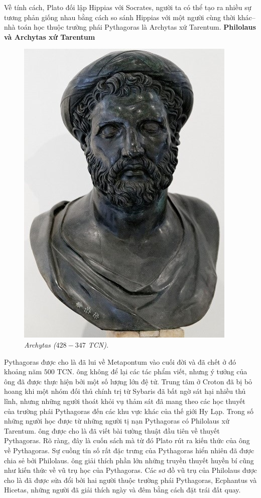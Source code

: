 \begin{multicols}{2}
	\vskip 0.05cm
	Về tính cách, Plato đối lập Hippias với Socrates, người ta có thể tạo ra nhiều sự tương phản giống nhau bằng cách so sánh Hippias với một người cùng thời khác--nhà toán học thuộc trường phái Pythagoras là Archytas xứ Tarentum.
	\vskip 0.05cm
	\textbf{\color{lichsutoanhoc}Philolaus và Archytas xứ Tarentum}
	\begin{figure}[H]
		\vspace*{-5pt}
		\centering
		\captionsetup{labelformat= empty, justification=centering}
		\includegraphics[width= 0.65\linewidth]{2}
		\caption{\small\textit{\color{lichsutoanhoc}Archytas ($428-347$ TCN).}}
		\vspace*{-10pt}
	\end{figure}
	Pythagoras được cho là đã lui về Metapontum vào cuối đời và đã chết ở đó khoảng năm $500$ TCN.  ông không để lại các tác phẩm viết, nhưng ý tưởng của ông đã được thực hiện bởi một số lượng lớn đệ tử. Trung tâm ở Croton đã bị bỏ hoang khi một nhóm đối thủ chính trị từ Sybaris đã bất ngờ sát hại nhiều thủ lĩnh, nhưng những người thoát khỏi vụ thảm sát đã mang theo các học thuyết của trường phái Pythagoras đến các khu vực khác của thế giới Hy Lạp. Trong số những người học được từ những người tị nạn Pythagoras có Philolaus xứ Tarentum. ông được cho là đã viết bài tường thuật đầu tiên về thuyết Pythagoras.  Rõ ràng, đây là cuốn sách mà từ đó Plato rút ra kiến thức của ông về Pythagoras.  
	\vskip 0.05cm
	Sự cuồng tín số rất đặc trưng của Pythagoras hiển nhiên đã được chia sẻ bởi Philolaus. ông giải thích phần lớn những truyền thuyết huyền bí cũng như kiến thức về vũ trụ học của Pythagoras. Các sơ đồ vũ trụ của Philolaus được cho là đã được sửa đổi bởi hai người thuộc trường phái Pythagoras, Ecphantus và Hicetas, những người đã giải thích ngày và đêm bằng cách đặt trái đất quay.  

\end{multicols}
